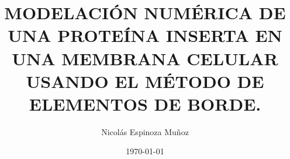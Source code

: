 \documentclass{beamer}
\author{Nicolás Espinoza Muñoz}
\title{MODELACIÓN NUMÉRICA DE UNA PROTEÍNA INSERTA EN UNA MEMBRANA CELULAR USANDO EL MÉTODO DE ELEMENTOS DE BORDE.}
\institute{UNIVERSIDAD TÉCNICA FEDERICO SANTA MARÍA}
\date{\today}
\begin{document}
\begin{frame}
\titleframe
\end{frame}
\end{document}
